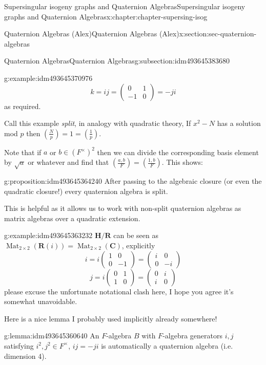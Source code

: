 \documentclass[oneside,10pt,]{book}
\numberwithin{equation}{section}
\newcommand{\legendre}[2]{\left(\frac{#1}{#2}\right)}
\newcommand{\RR}{\mathbf{R}}
\newcommand{\CC}{\mathbf{C}}
\newcommand{\HH}{\mathbf{H}}
\DeclareMathOperator{\Mat}{Mat}
\newcommand{\amp}{&}
\begin{document}
\begin{chapterptx}{Supersingular isogeny graphs and Quaternion Algebras}{}{Supersingular isogeny graphs and Quaternion Algebras}{}{}{x:chapter:chapter-supersing-isog}
\begin{sectionptx}{Quaternion Algebras (Alex)}{}{Quaternion Algebras (Alex)}{}{}{x:section:sec-quaternion-algebras}
\begin{subsectionptx}{Quaternion Algebras}{}{Quaternion Algebras}{}{}{g:subsection:idm493645383680}
\begin{introduction}{}
\begin{example}{}{g:example:idm493645370976}
\begin{equation*}
k = ij = \begin{pmatrix} 0\amp1\\-1\amp 0\end{pmatrix} = -ji
\end{equation*}
as required.%
\end{example}
Call this example \emph{split}, in analogy with quadratic theory,  If \(x^2 - N\) has a solution mod \(p\) then \(\legendre{N}{p} = 1 = \legendre{1}{p}\).%
\par
Note that if \(a\) or \(b \in (F^\times)^2\) then we can divide the corresponding basis element by \(\sqrt{a}\) or whatever and find that \(\legendre{a,b}{F} = \legendre{1,b}{F}\). This shows:%
\begin{proposition}{}{}{g:proposition:idm493645364240}%
After passing to the algebraic closure (or even the quadratic closure!) every quaternion algebra is split.%
\end{proposition}
This is helpful as it allows us to work with non-split quaternion algebras as matrix algebras over a quadratic extension.%
\begin{example}{}{g:example:idm493645363232}%
\(\HH/\RR\) can be seen as \(\Mat_{2\times 2}(\RR(i)) = \Mat_{2\times 2}(\CC)\), explicitly%
\begin{equation*}
i=  i\begin{pmatrix} 1\amp0\\0\amp -1\end{pmatrix} = \begin{pmatrix} i\amp0\\0\amp -i\end{pmatrix}
\end{equation*}
%
\begin{equation*}
j = i\begin{pmatrix} 0\amp1\\1\amp 0\end{pmatrix} = \begin{pmatrix} 0\amp i\\i\amp 0\end{pmatrix}
\end{equation*}
please excuse the unfortunate notational clash here, I hope you agree it's somewhat unavoidable.%
\end{example}
Here is a nice lemma I probably used implicitly already somewhere!%
\begin{lemma}{}{}{g:lemma:idm493645360640}%
An \(F\)-algebra \(B\) with \(F\)-algebra generators \(i,j\) satisfying \(i^2,j^2\in F^\times\), \(ij = -ji\) is automatically a quaternion algebra (i.e. dimension 4).%

\end{lemma}
\end{introduction}
\end{subsectionptx}
\end{sectionptx}
\end{chapterptx}
\end{document}
